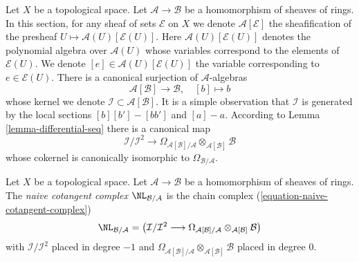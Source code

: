\medskip\noindent
Let $X$ be a topological space. Let $\mathcal{A} \to \mathcal{B}$ be a
homomorphism of sheaves of rings. In this section, for any sheaf of sets
$\mathcal{E}$ on $X$ we denote $\mathcal{A}[\mathcal{E}]$ the sheafification
of the presheaf $U \mapsto \mathcal{A}(U)[\mathcal{E}(U)]$. Here
$\mathcal{A}(U)[\mathcal{E}(U)]$
denotes the polynomial algebra over $\mathcal{A}(U)$
whose variables correspond to the elements of $\mathcal{E}(U)$.
We denote $[e] \in \mathcal{A}(U)[\mathcal{E}(U)]$ the variable
corresponding to $e \in \mathcal{E}(U)$.
There is a canonical surjection of $\mathcal{A}$-algebras
\begin{equation}
\label{equation-canonical-presentation}
\mathcal{A}[\mathcal{B}] \longrightarrow \mathcal{B},\quad [b] \longmapsto b
\end{equation}
whose kernel we denote $\mathcal{I} \subset \mathcal{A}[\mathcal{B}]$.
It is a simple observation that $\mathcal{I}$ is generated by the
local sections $[b][b'] - [bb']$ and $[a] - a$. According to
Lemma \ref{lemma-differential-seq} there is a canonical map
\begin{equation}
\label{equation-naive-cotangent-complex}
\mathcal{I}/\mathcal{I}^2
\longrightarrow
\Omega_{\mathcal{A}[\mathcal{B}]/\mathcal{A}}
\otimes_{\mathcal{A}[\mathcal{B}]} \mathcal{B}
\end{equation}
whose cokernel is canonically isomorphic to $\Omega_{\mathcal{B}/\mathcal{A}}$.

\begin{definition}
\label{definition-naive-cotangent-complex}
Let $X$ be a topological space. Let $\mathcal{A} \to \mathcal{B}$ be a
homomorphism of sheaves of rings. The {\it naive cotangent complex}
$\NL_{\mathcal{B}/\mathcal{A}}$ is the chain complex
(\ref{equation-naive-cotangent-complex})
$$
\NL_{\mathcal{B}/\mathcal{A}} =
\left(\mathcal{I}/\mathcal{I}^2
\longrightarrow
\Omega_{\mathcal{A}[\mathcal{B}]/\mathcal{A}}
\otimes_{\mathcal{A}[\mathcal{B}]} \mathcal{B}\right)
$$
with $\mathcal{I}/\mathcal{I}^2$ placed in degree $-1$ and
$\Omega_{\mathcal{A}[\mathcal{B}]/\mathcal{A}}
\otimes_{\mathcal{A}[\mathcal{B}]} \mathcal{B}$
placed in degree $0$.
\end{definition}

